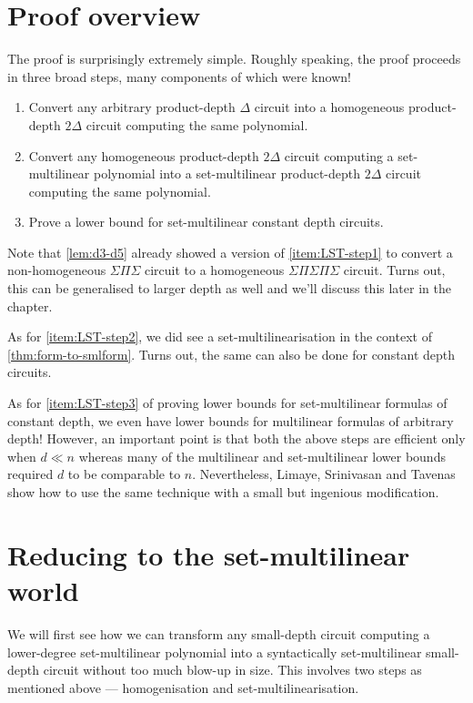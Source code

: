\section{Proof overview}

The proof is surprisingly extremely simple. Roughly speaking, the proof proceeds in three broad steps, many components of which were known!

\begin{enumerate}
\item\label{item:LST-step1} Convert any arbitrary product-depth $\Delta$ circuit into a homogeneous product-depth $2\Delta$ circuit computing the same polynomial.
\item\label{item:LST-step2} Convert any homogeneous product-depth $2\Delta$ circuit computing a set-multilinear polynomial into a set-multilinear product-depth $2\Delta$ circuit computing the same polynomial.
\item\label{item:LST-step3} Prove a lower bound for set-multilinear constant depth circuits. 
\end{enumerate}

Note that \autoref{lem:d3-d5} already showed a version of \autoref{item:LST-step1} to convert a non-homogeneous $\Sigma\Pi\Sigma$ circuit to a homogeneous $\Sigma\Pi\Sigma\Pi\Sigma$ circuit. Turns out, this can be generalised to larger depth as well and we'll discuss this later in the chapter.

As for \autoref{item:LST-step2}, we did see a set-multilinearisation in the context of \autoref{thm:form-to-smlform}. Turns out, the same can also be done for constant depth circuits.

As for \autoref{item:LST-step3} of proving lower bounds for set-multilinear formulas of constant depth, we even have lower bounds for multilinear formulas of arbitrary depth! However, an important point is that both the above steps are efficient only when $d \ll n$ whereas many of the multilinear and set-multilinear lower bounds required $d$ to be comparable to $n$. Nevertheless, Limaye, Srinivasan and Tavenas show how to use the same technique with a small but ingenious modification.

\section{Reducing to the set-multilinear world}

We will first see how we can transform any small-depth circuit computing a lower-degree set-multilinear polynomial into a syntactically set-multilinear small-depth circuit without too much blow-up in size. This involves two steps as mentioned above --- homogenisation and set-multilinearisation. 

